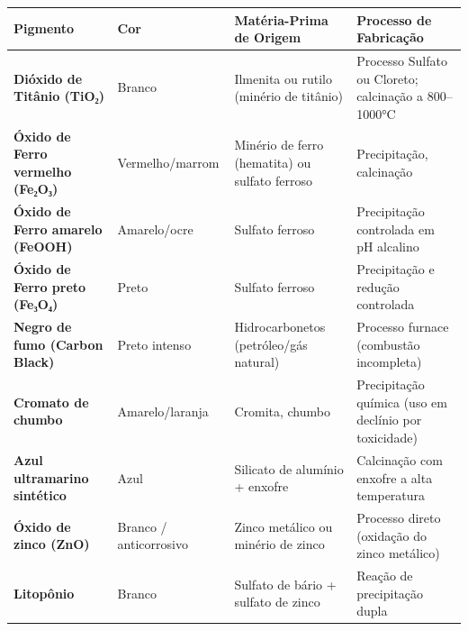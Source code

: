 \documentclass[
  12pt,
  a4paper,
  oneside,
  brazil,
  chapter=TITLE
]{article}
\begin{document}
{\def\LTcaptype{none} %
\begin{longtable}[]{@{}
  >{\raggedright\arraybackslash}p{}
  >{\raggedright\arraybackslash}p{}
  >{\raggedright\arraybackslash}p{}
  >{\raggedright\arraybackslash}p{}@{}}
\toprule\noalign{}
\begin{minipage}[b]{\linewidth}\raggedright
Pigmento
\end{minipage} & \begin{minipage}[b]{\linewidth}\raggedright
Cor
\end{minipage} & \begin{minipage}[b]{\linewidth}\raggedright
Matéria-Prima de Origem
\end{minipage} & \begin{minipage}[b]{\linewidth}\raggedright
Processo de Fabricação
\end{minipage} \\
\midrule\noalign{}
\endhead
\bottomrule\noalign{}
\endlastfoot
\textbf{Dióxido de Titânio (TiO₂)} & Branco & Ilmenita ou rutilo
(minério de titânio) & Processo Sulfato ou Cloreto; calcinação a
800--1000°C \\
\textbf{Óxido de Ferro vermelho (Fe₂O₃)} & Vermelho/marrom & Minério de
ferro (hematita) ou sulfato ferroso & Precipitação, calcinação \\
\textbf{Óxido de Ferro amarelo (FeOOH)} & Amarelo/ocre & Sulfato ferroso
& Precipitação controlada em pH alcalino \\
\textbf{Óxido de Ferro preto (Fe₃O₄)} & Preto & Sulfato ferroso &
Precipitação e redução controlada \\
\textbf{Negro de fumo (Carbon Black)} & Preto intenso & Hidrocarbonetos
(petróleo/gás natural) & Processo furnace (combustão incompleta) \\
\textbf{Cromato de chumbo} & Amarelo/laranja & Cromita, chumbo &
Precipitação química (uso em declínio por toxicidade) \\
\textbf{Azul ultramarino sintético} & Azul & Silicato de alumínio +
enxofre & Calcinação com enxofre a alta temperatura \\
\textbf{Óxido de zinco (ZnO)} & Branco / anticorrosivo & Zinco metálico
ou minério de zinco & Processo direto (oxidação do zinco metálico) \\
\textbf{Litopônio} & Branco & Sulfato de bário + sulfato de zinco &
Reação de precipitação dupla \\
\end{longtable}
}
\end{document}
